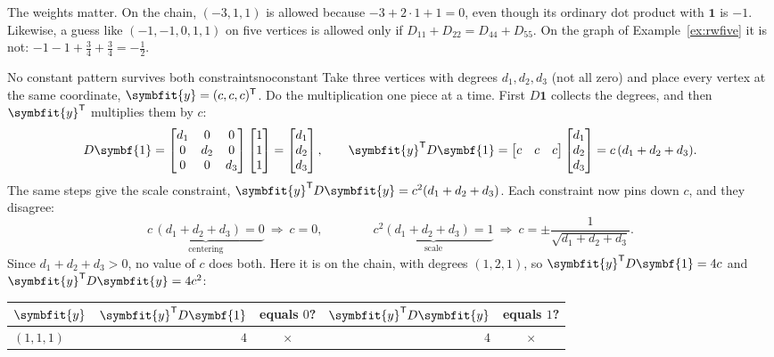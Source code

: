 \documentclass[11pt]{article}
\newcommand{\bm}[1]{\symbfit{#1}}
\newcommand{\one}{\symbf{1}}
\newcommand{\T}{^{\mathsf T}}
\begin{document}
The weights matter. On the chain, $(-3,1,1)$ is allowed because $-3+2\cdot1+1=0$, even though its ordinary dot product with $\one$ is $-1$. Likewise, a guess like $(-1,-1,0,1,1)$ on five vertices is allowed only if $D_{11}+D_{22}=D_{44}+D_{55}$. On the graph of Example~\ref{ex:rwfive} it is not: $-1-1+\tfrac34+\tfrac34=-\tfrac12$.

\begin{example}{No constant pattern survives both constraints}{noconstant}
Take three vertices with degrees $d_1,d_2,d_3$ (not all zero) and place every vertex at the same coordinate, $\bm y=(c,c,c)\T$. Do the multiplication one piece at a time. First $D\one$ collects the degrees, and then $\bm y\T$ multiplies them by $c$:
\[
D\one=\begin{bmatrix}d_1&0&0\\0&d_2&0\\0&0&d_3\end{bmatrix}\begin{bmatrix}1\\1\\1\end{bmatrix}=\begin{bmatrix}d_1\\d_2\\d_3\end{bmatrix},
\qquad
\bm y\T D\one=\begin{bmatrix}c&c&c\end{bmatrix}\begin{bmatrix}d_1\\d_2\\d_3\end{bmatrix}=c\,(d_1+d_2+d_3).
\]
The same steps give the scale constraint, $\bm y\T D\bm y=c^2(d_1+d_2+d_3)$. Each constraint now pins down $c$, and they disagree:
\[
\underbrace{c\,(d_1+d_2+d_3)=0}_{\text{centering}}\ \Longrightarrow\ c=0,
\qquad\qquad
\underbrace{c^2(d_1+d_2+d_3)=1}_{\text{scale}}\ \Longrightarrow\ c=\pm\frac1{\sqrt{d_1+d_2+d_3}}.
\]
Since $d_1+d_2+d_3>0$, no value of $c$ does both. Here it is on the chain, with degrees $(1,2,1)$, so $\bm y\T D\one=4c$ and $\bm y\T D\bm y=4c^2$:
\begin{center}
\small
\renewcommand{\arraystretch}{1.2}
\begin{tabular}{@{}lrcrc@{}}
\toprule
$\bm y$ & $\bm y\T D\one$ & equals $0$? & $\bm y\T D\bm y$ & equals $1$? \\
\midrule
$(1,1,1)$ & $4$ & \textcolor{thmred}{$\times$} & $4$ & \textcolor{thmred}{$\times$} \\

\end{tabular}
\end{center}
\end{example}
\end{document}
